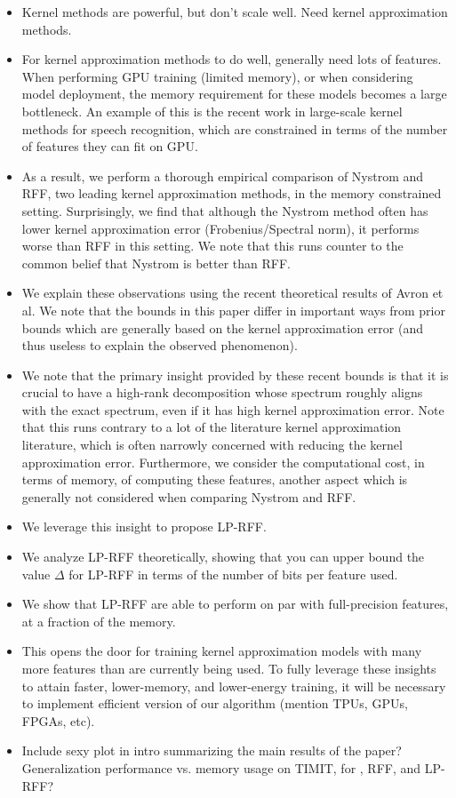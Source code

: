 \begin{itemize}
	\item Kernel methods are powerful, but don't scale well.  Need kernel approximation methods.
	\item For kernel approximation methods to do well, generally need lots of features.  When performing GPU training (limited memory), or when considering model deployment, the memory requirement for these models becomes a large bottleneck.  An example of this is the recent work in large-scale kernel methods for speech recognition, which are constrained in terms of the number of features they can fit on GPU.
	\item As a result, we perform a thorough empirical comparison of Nystrom and RFF, two leading kernel approximation methods, in the memory constrained setting.  Surprisingly, we find that although the Nystrom method often has lower kernel approximation error (Frobenius/Spectral norm), it performs worse than RFF in this setting.  We note that this runs counter to the common belief that Nystrom is better than RFF.
	\item We explain these observations using the recent theoretical results of Avron et al.  We note that the bounds in this paper differ in important ways from prior bounds which are generally based on the kernel approximation error (and thus useless to explain the observed phenomenon).
	\item We note that the primary insight provided by these recent bounds is that it is crucial to have a high-rank decomposition whose spectrum roughly aligns with the exact spectrum, even if it has high kernel approximation error.  Note that this runs contrary to a lot of the literature kernel approximation literature, which is often narrowly concerned with reducing the kernel approximation error.  Furthermore, we consider the computational cost, in terms of memory, of computing these features, another aspect which is generally not considered when comparing Nystrom and RFF.
	\item We leverage this insight to propose LP-RFF.
	\item We analyze LP-RFF theoretically, showing that you can upper bound the value $\Delta$ for LP-RFF in terms of the number of bits per feature used.
	\item We show that LP-RFF are able to perform on par with full-precision features, at a fraction of the memory.
	\item This opens the door for training kernel approximation models with many more features than are currently being used.  To fully leverage these insights to attain faster, lower-memory, and lower-energy training, it will be necessary to implement efficient version of our algorithm (mention TPUs, GPUs, FPGAs, etc). 
	\item Include sexy plot in intro summarizing the main results of the paper?  Generalization performance vs. memory usage on TIMIT, for \Nystrom, RFF, and LP-RFF?
\end{itemize}

